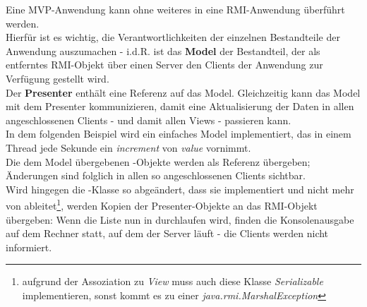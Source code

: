 Eine MVP-Anwendung kann ohne weiteres in eine RMI-Anwendung überführt werden.\\

\noindent
Hierfür ist es wichtig, die Verantwortlichkeiten der einzelnen Bestandteile der Anwendung auszumachen - i.d.R. ist das \textbf{Model} der Bestandteil, der als entferntes RMI-Objekt über einen Server den Clients der Anwendung zur Verfügung gestellt wird.\\

Der \textbf{Presenter} enthält eine Referenz auf das Model.
Gleichzeitig kann das Model mit dem Presenter kommunizieren, damit eine Aktualisierung der Daten in allen angeschlossenen Clients - und damit allen Views - passieren kann.\\

\noindent
In dem folgenden Beispiel wird ein einfaches Model implementiert, das in einem Thread jede Sekunde ein \textit{increment} von \textit{value} vornimmt.\\
Die dem Model übergebenen -Objekte werden als Referenz übergeben; Änderungen sind folglich in allen so angeschlossenen Clients sichtbar.\\
Wird hingegen die -Klasse so abgeändert, dass sie  implementiert und nicht mehr von  ableitet\footnote{
aufgrund der Assoziation zu {\textit{View}} muss auch diese Klasse \textit{Serializable} implementieren, sonst kommt es zu einer {\textit{java.rmi.MarshalException}}
}, werden Kopien der Presenter-Objekte an das RMI-Objekt übergeben: Wenn die Liste nun in  durchlaufen wird, finden die Konsolenausgabe auf dem Rechner statt, auf dem der Server läuft - die Clients werden nicht informiert.

